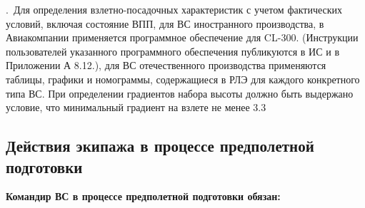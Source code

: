 \thesubsection.\ Для определения взлетно-посадочных характеристик с учетом фактических условий, включая состояние ВПП, для ВС иностранного производства, в Авиакомпании применяется программное обеспечение для CL-300. (Инструкции пользователей указанного программного обеспечения публикуются в ИС и в Приложении А 8.12.), для ВС отечественного производства применяются таблицы, графики и номограммы, содержащиеся в РЛЭ для каждого конкретного типа ВС.
При определении градиентов набора высоты должно быть выдержано условие, что минимальный градиент на взлете не менее 3.3%

\subsection{Действия экипажа в процессе предполетной подготовки}
\setcounter{subsect}{1}

\textbf{Командир ВС в процессе предполетной подготовки обязан:}


